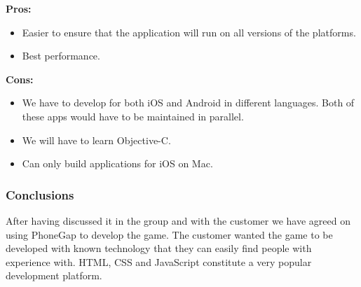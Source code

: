 \indent
  {\bf Pros:}
  \begin{itemize}
    \item Easier to ensure that the application will run on all versions of
          the platforms.
    \item Best performance.
  \end{itemize}

\indent
  {\bf Cons:}
  \begin{itemize}
    \item We have to develop for both iOS and Android in different languages.
          Both of these apps would have to be maintained in parallel.
    \item We will have to learn Objective-C.
    \item Can only build applications for iOS on Mac.
  \end{itemize}

\noindent
\subsubsection{Conclusions}
After having discussed it in the group and with the customer we have agreed
on using PhoneGap to develop the game. The customer wanted the game to
be developed with known technology that they can easily find people with
experience with. HTML, CSS and JavaScript constitute a very popular development
platform.


